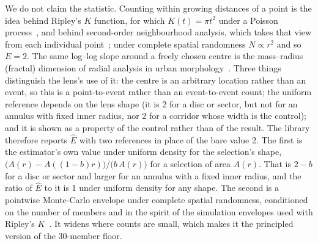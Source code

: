 We do not claim the statistic. Counting within growing distances of a point is
the idea behind Ripley's $K$ function, for which $K(t)=\pi t^2$ under a Poisson
process~\cite{ripley1977modelling}, and behind second-order neighbourhood
analysis, which takes that view from each individual
point~\cite{getis1987second}; under complete spatial randomness $N\propto r^2$
and so $E=2$. The same log--log slope around a freely chosen centre is the
mass--radius (fractal) dimension of radial analysis in urban
morphology~\cite{yamu2016fractal}. Three things distinguish the lens's use of it:
the centre is an arbitrary location rather than an event, so this is a
point-to-event rather than an event-to-event count; the uniform reference
depends on the lens shape (it is 2 for a disc or sector, but not for an annulus
with fixed inner radius, nor 2 for a corridor whose width is the control); and
it is shown as a property of the control rather than of the result.
The library therefore reports $\hat E$ with two references in place of the bare
value 2. The first is the estimator's own value under uniform density for the
selection's shape, $\big(A(r)-A((1-b)r)\big)/\big(b\,A(r)\big)$ for a selection
of area $A(r)$. That is $2-b$ for a disc or sector and larger for an annulus
with a fixed inner radius, and the ratio of $\hat E$ to it is 1 under uniform
density for any shape. The second is a pointwise Monte-Carlo envelope under
complete spatial randomness, conditioned on the number of members and in the
spirit of the simulation envelopes used with Ripley's
$K$~\cite{ripley1977modelling}. It widens where counts are small, which makes
it the principled version of the 30-member floor.

